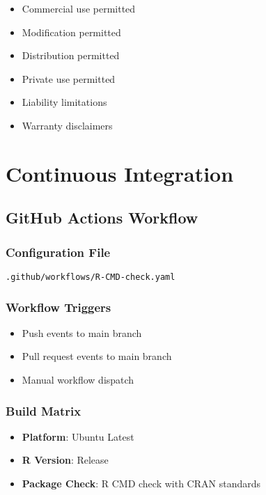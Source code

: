 \documentclass[
  11pt,
]{article}
\providecommand{\tightlist}{%
  \setlength{\itemsep}{0pt}\setlength{\parskip}{0pt}}
\begin{document}
\begin{itemize}
\tightlist
\item
  Commercial use permitted
\item
  Modification permitted
\item
  Distribution permitted
\item
  Private use permitted
\item
  Liability limitations
\item
  Warranty disclaimers
\end{itemize}

\newpage

\section{Continuous Integration}\label{continuous-integration}

\subsection{GitHub Actions Workflow}\label{github-actions-workflow}

\subsubsection{Configuration File}\label{configuration-file}

\texttt{.github/workflows/R-CMD-check.yaml}

\subsubsection{Workflow Triggers}\label{workflow-triggers}

\begin{itemize}
\tightlist
\item
  Push events to main branch
\item
  Pull request events to main branch
\item
  Manual workflow dispatch
\end{itemize}

\subsubsection{Build Matrix}\label{build-matrix}

\begin{itemize}
\tightlist
\item
  \textbf{Platform}: Ubuntu Latest
\item
  \textbf{R Version}: Release
\item
  \textbf{Package Check}: R CMD check with CRAN standards
\end{itemize}
\end{document}

